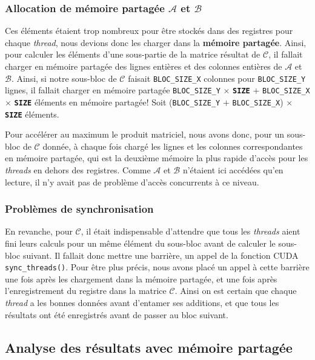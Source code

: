 \documentclass[	DIV=calc,%
							paper=a4,%
							fontsize=11pt%
							]{scrartcl}	 					%
\begin{document}
\subsubsection{Allocation de mémoire partagée  $\mathcal{A}$ et $\mathcal{B}$}
Ces éléments étaient trop nombreux pour être stockés dans des registres pour chaque \textit{thread}, nous devions donc les charger dans la \textbf{mémoire partagée}. Ainsi, pour calculer les éléments d'une sous-partie de la matrice résultat de $\mathcal{C}$, il fallait charger en mémoire partagée des lignes entières et des colonnes entières de $\mathcal{A}$ et $\mathcal{B}$. Ainsi, si notre sous-bloc de $\mathcal{C}$ faisait \texttt{BLOC\_SIZE\_X} colonnes pour \texttt{BLOC\_SIZE\_Y} lignes, il fallait charger en mémoire partagée \texttt{BLOC\_SIZE\_Y}  $\times$ \textbf{\texttt{SIZE}} $+$ \texttt{BLOC\_SIZE\_X}  $\times$ \textbf{\texttt{SIZE}} éléments en mémoire partagée! Soit (\texttt{BLOC\_SIZE\_Y} $+$ \texttt{BLOC\_SIZE\_X}) $\times$ \textbf{\texttt{SIZE}} éléments.\par
Pour accélérer au maximum le produit matriciel, nous avons donc, pour un sous-bloc de $\mathcal{C}$ donnée, à chaque fois chargé les lignes et les colonnes correspondantes en mémoire partagée, qui est la deuxième mémoire la plus rapide d'accès pour les \textit{threads} en dehors des registres. Comme $\mathcal{A}$ et $\mathcal{B}$ n'étaient ici accédées qu'en lecture, il n'y avait pas de problème d'accès concurrents à ce niveau.
\subsubsection{Problèmes de synchronisation}
En revanche, pour $\mathcal{C}$, il était indispensable d'attendre que tous les \textit{threads} aient fini leurs calculs pour un même élément du sous-bloc avant de calculer le sous-bloc suivant. Il fallait donc mettre une barrière, un appel de la fonction CUDA \texttt{sync\_threads()}. Pour être plus précis, nous avons placé un appel à cette barrière une fois après les chargement dans la mémoire partagée, et une fois après l'enregistrement du registre dans la matrice $\mathcal{C}$. Ainsi on est certain que chaque \textit{thread} a les bonnes données avant d'entamer ses additions, et que tous les résultats ont été enregistrés avant de passer au bloc suivant.
\subsection{Analyse des résultats avec mémoire partagée}
\end{document}
